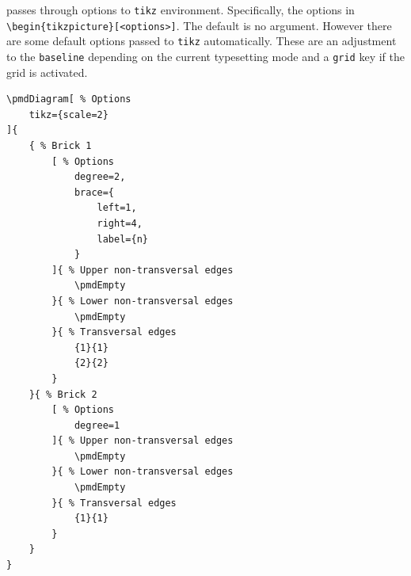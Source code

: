 \documentclass{ltxdoc}
\begin{document}
passes through options to \texttt{tikz} environment. Specifically, the options in \verb`\begin{tikzpicture}[<options>]`. The default is no argument. However there are some default options passed to \texttt{tikz} automatically. These are an adjustment to the \texttt{baseline} depending on the current typesetting mode and a \texttt{grid} key if the grid is activated.
\begin{center}
    \begin{minipage}{\dimexpr0.85\textwidth-2\fboxrule-2\fboxsep\relax}
        \begin{minipage}[c]{0.4\linewidth}
\begin{verbatim}
\pmdDiagram[ % Options
    tikz={scale=2}
]{
    { % Brick 1
        [ % Options
            degree=2,
            brace={
                left=1,
                right=4,
                label={n}
            }
        ]{ % Upper non-transversal edges
            \pmdEmpty
        }{ % Lower non-transversal edges
            \pmdEmpty
        }{ % Transversal edges
            {1}{1}
            {2}{2}
        }
    }{ % Brick 2
        [ % Options
            degree=1
        ]{ % Upper non-transversal edges
            \pmdEmpty
        }{ % Lower non-transversal edges
            \pmdEmpty
        }{ % Transversal edges
            {1}{1}
        }
    }
}
\end{verbatim}
        \end{minipage}
        \hfill
        \begin{minipage}[c]{0.4\linewidth}
        \end{minipage}
    \end{minipage}%
\end{center}
\begin{center}
\end{center}
\end{document}
